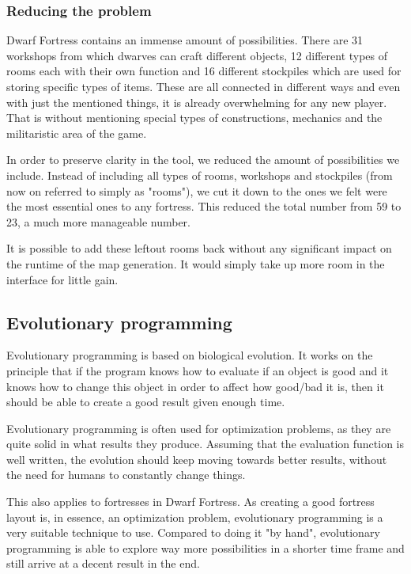 \subsubsection{Reducing the problem}
\label{02_DF_Reducing}

Dwarf Fortress contains an immense amount of possibilities. There are 31 workshops\cite{dfwiki:Workshops} from which dwarves can craft different objects, 12 different types of rooms\cite{dfwiki:Rooms} each with their own function and 16 different stockpiles\cite{dfwiki:Stockpiles} which are used for storing specific types of items. These are all connected in different ways and even with just the mentioned things, it is already overwhelming for any new player. That is without mentioning special types of constructions, mechanics and the militaristic area of the game.

In order to preserve clarity in the tool, we reduced the amount of possibilities we include. Instead of including all types of rooms, workshops and stockpiles (from now on referred to simply as "rooms"), we cut it down to the ones we felt were the most essential ones to any fortress. This reduced the total number from 59 to 23, a much more manageable number.

It is possible to add these leftout rooms back without any significant impact on the runtime of the map generation. It would simply take up more room in the interface for little gain.

\subsection{Evolutionary programming}
\label{02_Evolution}

Evolutionary programming\cite[Chapter 2]{IoEC} is based on biological evolution. It works on the principle that if the program knows how to evaluate if an object is good and it knows how to change this object in order to affect how good/bad it is, then it should be able to create a good result given enough time.

Evolutionary programming is often used for optimization problems, as they are quite solid in what results they produce. Assuming that the evaluation function is well written, the evolution should keep moving towards better results, without the need for humans to constantly change things.

This also applies to fortresses in Dwarf Fortress. As creating a good fortress layout is, in essence, an optimization problem, evolutionary programming is a very suitable technique to use. Compared to doing it "by hand", evolutionary programming is able to explore way more possibilities in a shorter time frame and still arrive at a decent result in the end.